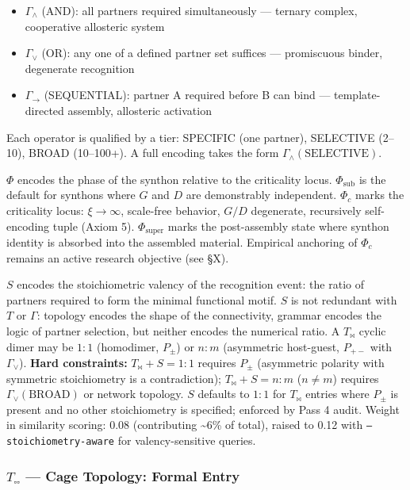 \documentclass[12pt,a4paper]{article}
\begin{document}
\begin{itemize}
    \item $\Gamma_{\wedge}$ (AND): all partners required simultaneously --- ternary complex, cooperative allosteric system
    \item $\Gamma_{\vee}$ (OR): any one of a defined partner set suffices --- promiscuous binder, degenerate recognition
    \item $\Gamma_{\to}$ (SEQUENTIAL): partner A required before B can bind --- template-directed assembly, allosteric activation
\end{itemize}

Each operator is qualified by a tier: SPECIFIC (one partner), SELECTIVE (2--10), BROAD (10--100+). A full encoding takes the form $\Gamma_{\wedge}(\text{SELECTIVE})$.

\textbf{$\Phi$} encodes the phase of the synthon relative to the criticality locus. $\Phi_{\text{sub}}$ is the default for synthons where $G$ and $D$ are demonstrably independent. $\Phi_c$ marks the criticality locus: $\xi \to \infty$, scale-free behavior, $G/D$ degenerate, recursively self-encoding tuple (Axiom 5). $\Phi_{\text{super}}$ marks the post-assembly state where synthon identity is absorbed into the assembled material. Empirical anchoring of $\Phi_c$ remains an active research objective (see §X).

\textbf{$S$} encodes the stoichiometric valency of the recognition event: the ratio of partners required to form the minimal functional motif. $S$ is not redundant with $T$ or $\Gamma$: topology encodes the shape of the connectivity, grammar encodes the logic of partner selection, but neither encodes the numerical ratio. A $T_{\bowtie}$ cyclic dimer may be $1:1$ (homodimer, $P_{\pm}$) or $n:m$ (asymmetric host-guest, $P_{+-}$ with $\Gamma_{\vee}$). \textbf{Hard constraints:} $T_{\bowtie} + S = 1:1$ requires $P_{\pm}$ (asymmetric polarity with symmetric stoichiometry is a contradiction); $T_{\bowtie} + S = n:m$ ($n \neq m$) requires $\Gamma_{\vee}(\text{BROAD})$ or network topology. $S$ defaults to $1:1$ for $T_{\bowtie}$ entries where $P_{\pm}$ is present and no other stoichiometry is specified; enforced by Pass 4 audit. Weight in similarity scoring: 0.08 (contributing \textasciitilde{}6\% of total), raised to 0.12 with \texttt{--stoichiometry-aware} for valency-sensitive queries.

\subsubsection{$T_{\square\square}$ --- Cage Topology: Formal Entry}
\end{document}

